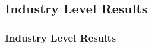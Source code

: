 \documentclass[notes,11pt, aspectratio=169]{beamer}
\newenvironment{transitionframe}{
  \setbeamercolor{background canvas}{bg=yellow}
  \begin{frame}}{
    \end{frame}
}
\newenvironment{wideitemize}{\itemize\addtolength{\itemsep}{10pt}}{\enditemize}
\begin{document}
\subsection{Industry Level Results}
\begin{frame}
  \frametitle{Industry Level Results}
  

\end{frame}





        
\end{document}
